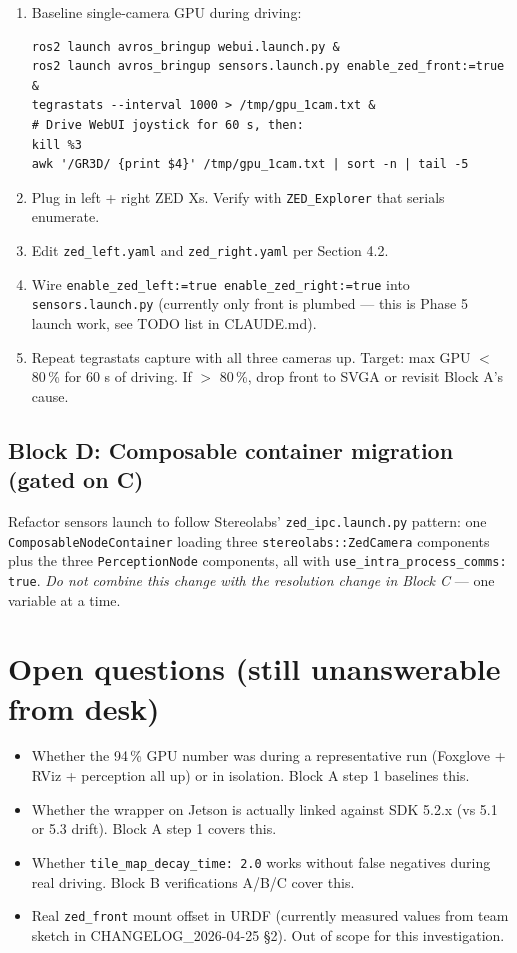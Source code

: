 \documentclass[11pt]{article}
\begin{document}
\begin{enumerate}[leftmargin=2em,nosep]
\item Baseline single-camera GPU during driving:
\begin{lstlisting}
ros2 launch avros_bringup webui.launch.py &
ros2 launch avros_bringup sensors.launch.py enable_zed_front:=true &
tegrastats --interval 1000 > /tmp/gpu_1cam.txt &
# Drive WebUI joystick for 60 s, then:
kill %3
awk '/GR3D/ {print $4}' /tmp/gpu_1cam.txt | sort -n | tail -5
\end{lstlisting}
\item Plug in left + right ZED Xs. Verify with \texttt{ZED\_Explorer} that
  serials enumerate.
\item Edit \texttt{zed\_left.yaml} and \texttt{zed\_right.yaml} per Section 4.2.
\item Wire \texttt{enable\_zed\_left:=true enable\_zed\_right:=true} into
  \texttt{sensors.launch.py} (currently only front is plumbed --- this is
  Phase 5 launch work, see TODO list in CLAUDE.md).
\item Repeat tegrastats capture with all three cameras up. Target: max GPU
  $<$ 80\,\% for 60 s of driving. If $>$ 80\,\%, drop front to SVGA or revisit
  Block A's cause.
\end{enumerate}

\subsection{Block D: Composable container migration (gated on C)}

Refactor sensors launch to follow Stereolabs'
\texttt{zed\_ipc.launch.py} pattern: one
\texttt{ComposableNodeContainer} loading three \texttt{stereolabs::ZedCamera}
components plus the three \texttt{PerceptionNode} components, all with
\texttt{use\_intra\_process\_comms: true}. \emph{Do not combine this change
with the resolution change in Block C} --- one variable at a time.

\section{Open questions (still unanswerable from desk)}

\begin{itemize}[leftmargin=2em,nosep]
\item Whether the 94\,\% GPU number was during a representative run
  (Foxglove + RViz + perception all up) or in isolation. Block A step 1
  baselines this.
\item Whether the wrapper on Jetson is actually linked against SDK 5.2.x
  (vs 5.1 or 5.3 drift). Block A step 1 covers this.
\item Whether \texttt{tile\_map\_decay\_time: 2.0} works without false
  negatives during real driving. Block B verifications A/B/C cover this.
\item Real \texttt{zed\_front} mount offset in URDF (currently measured
  values from team sketch in CHANGELOG\_2026-04-25 \S 2). Out of scope
  for this investigation.
\end{itemize}
\end{document}
